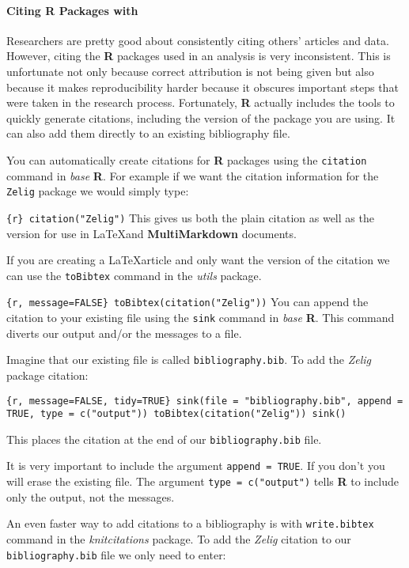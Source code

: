 \documentclass[ChapterTOCs,krantz1]{krantz}\usepackage{graphicx, color}
\begin{document}
\paragraph{Citing R Packages with \BibTeX}

Researchers are pretty good about consistently citing others' articles
and data. However, citing the \textbf{R} packages used in an analysis is
very inconsistent. This is unfortunate not only because correct
attribution is not being given but also because it makes reproducibility
harder because it obscures important steps that were taken in the
research process. Fortunately, \textbf{R} actually includes the tools to
quickly generate citations, including the version of the package you are
using. It can also add them directly to an existing bibliography file.

You can automatically create citations for \textbf{R} packages using the
\texttt{citation} command in \emph{base} \textbf{R}. For example if we
want the citation information for the \texttt{Zelig} package we would
simply type:

\texttt{\{r\}  citation("Zelig")} This gives us both the plain citation
as well as the \BibTeX version for use in \LaTeX and
\textbf{MultiMarkdown} documents.

If you are creating a \LaTeX article and only want the \BibTeX version
of the citation we can use the \texttt{toBibtex} command in the
\emph{utils} package.

\texttt{\{r, message=FALSE\} toBibtex(citation("Zelig"))} You can append
the citation to your existing \BibTeX file using the \texttt{sink}
command in \emph{base} \textbf{R}. This command diverts our output
and/or the messages to a file.

Imagine that our existing \BibTeX file is called
\texttt{bibliography.bib}. To add the \emph{Zelig} package citation:

\texttt{\{r, message=FALSE, tidy=TRUE\} sink(file = "bibliography.bib", append = TRUE, type = c("output"))      toBibtex(citation("Zelig")) sink()}

This places the citation at the end of our \texttt{bibliography.bib}
file.

It is very important to include the argument \texttt{append = TRUE}. If
you don't you will erase the existing file. The argument
\texttt{type = c("output")} tells \textbf{R} to include only the output,
not the messages.

An even faster way to add citations to a bibliography is with
\texttt{write.bibtex} command in the \emph{knitcitations} package. To
add the \emph{Zelig} citation to our \texttt{bibliography.bib} file we
only need to enter:
\end{document}
